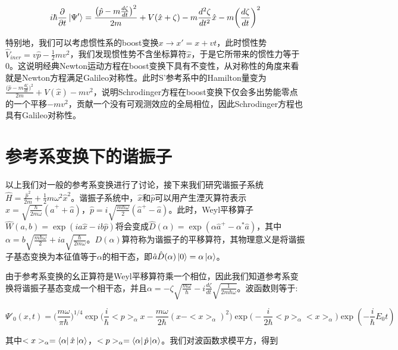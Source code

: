 \documentclass[a4paper]{article}
\begin{document}
        \begin{equation}
            i\hbar\frac{\partial}{\partial t}\ket{\Psi'} = \frac{\big(\hat{p}-m\frac{d\zeta}{dt}\big)^2}{2m} + V(\hat{x}+\zeta) - m \frac{d^2\zeta}{d t^2}\hat{x} - m\bigg(\frac{d\zeta}{dt}\bigg)^2
        \end{equation}

        特别地，我们可以考虑惯性系的boost变换$x\rightarrow x'=x+vt$，此时惯性势$\hat{V}_{iner}=v\hat{p}-\frac{1}{2}mv^2$，我们发现惯性势不含坐标算符$\hat{x}$，于是它所带来的惯性力等于0。这说明经典Newton运动方程在boost变换下具有不变性，从对称性的角度来看就是Newton方程满足Galileo对称性。此时S'参考系中的Hamilton量变为$\frac{\big(\hat{p}-m\frac{d\zeta}{dt}\big)^2}{2m}+V(\hat{x})-mv^2$，说明Schrodinger方程在boost变换下仅会多出势能零点的一个平移$-mv^2$，贡献一个没有可观测效应的全局相位，因此Schrodinger方程也具有Galileo对称性。
        


    \section{参考系变换下的谐振子}

        以上我们对一般的参考系变换进行了讨论，接下来我们研究谐振子系统$\hat{H}=\frac{\hat{p}^2}{2m}+\frac{1}{2}m\omega^2\hat{x}^2$。谐振子系统中，$\hat{x}$和$\hat{p}$可以用产生湮灭算符表示$\hat{x}=\sqrt{\frac{\hbar}{2m\omega}}(\hat{a}^{+}+\hat{a})$，$\hat{p}=i\sqrt{\frac{m\hbar\omega}{2}}(\hat{a}^{+}-\hat{a})$。此时，Weyl平移算子$\hat{W}(a, b)=\exp(ia\hat{x}-ib\hat{p})$将会变成$\hat{D}(\alpha)=\exp(\alpha\hat{a}^{+}-\alpha^*\hat{a})$，其中$\alpha=b\sqrt{\frac{m\hbar\omega}{2}}+ia\sqrt{\frac{\hbar}{2m\omega}}$。$D(\alpha)$算符称为谐振子的平移算符，其物理意义是将谐振子基态变换为本征值等于$\alpha$的相干态，即$\hat{a}\hat{D}(\alpha)\ket{0}=\alpha\ket{\alpha}$。

        由于参考系变换的幺正算符是Weyl平移算符乘一个相位，因此我们知道参考系变换将谐振子基态变成一个相干态，并且$\alpha=-\zeta\sqrt{\frac{m\omega}{\hbar}}-i\frac{d\zeta}{dt}\sqrt{\frac{1}{2m\hbar\omega}}$。波函数则等于:

        \begin{equation}
            \Psi'_0(x,t) = \bigg(\frac{m\omega}{\pi\hbar}\bigg)^{1/4} \exp\bigg(\frac{i}{\hbar}<p>_\alpha x-\frac{m\omega}{2\hbar}(x-<x>_\alpha)^2\bigg) \exp\bigg(-\frac{i}{2\hbar}<p>_\alpha<x>_\alpha\bigg) \exp(-\frac{i}{\hbar}E_0t)
        \end{equation}

        其中$<x>_\alpha=\bra{\alpha}\hat{x}\ket{\alpha}$，$<p>_\alpha=\Bra{\alpha}\hat{p}\ket{\alpha}$。我们对波函数求模平方，得到
\end{document}
